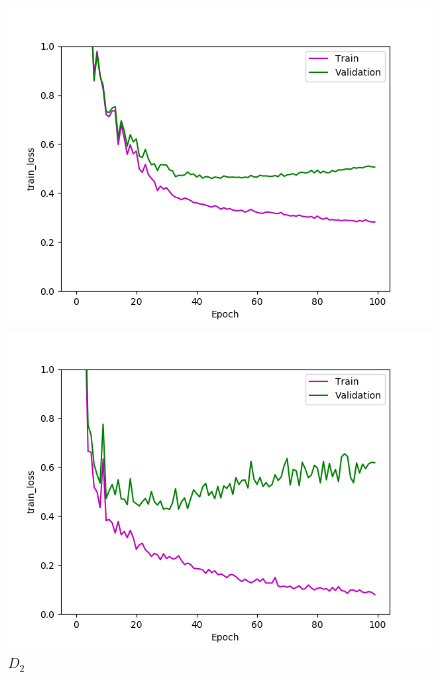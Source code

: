 \def\year{2017}\relax \documentclass[letterpaper]{article}
\begin{document}
\begin{figure}
\centering
\begin{minipage}{.24\textwidth}
  \centering
\includegraphics[width=\textwidth]{pics/d1_train_loss_best_train_test.png}
\caption{$D_1$}\label{fig:d1lossraintest}
\end{minipage}
\begin{minipage}{.01\textwidth}
\end{minipage}
\begin{minipage}{.24\textwidth}
  \centering
\includegraphics[width=\textwidth]{pics/d2_train_loss_best_train_test.png}
\caption{$D_2$}\label{fig:d2losstraintest}
\end{minipage}

\end{figure}
\end{document}
